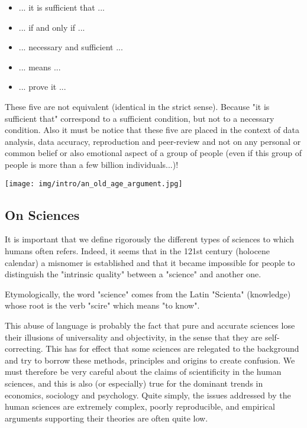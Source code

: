 	\begin{itemize}
	\item ... it is sufficient that ...
	
	\item ... if and only if ...
	
	\item ... necessary and sufficient ...
	
	\item ... means ...
	
	\item ... prove it ...
	\end{itemize}
	These five are not equivalent (identical in the strict sense). Because "it is sufficient that" correspond to a sufficient condition, but not to a necessary condition. Also it must be notice that these five are placed in the context of data analysis, data accuracy, reproduction and peer-review and not on any personal or common belief or also emotional aspect of a group of people (even if this group of people is more than a few billion individuals...)!
	\begin{center}
		\texttt{[image: img/intro/an\_old\_age\_argument.jpg]}
	\end{center}

	\subsection{On Sciences}	
	It is important that we define rigorously the different types of sciences to which humans often refers. Indeed, it seems that in the 121st century (holocene calendar) a misnomer is established and that it became impossible for people to distinguish the "intrinsic quality" between a "science" and another one.

	\begin{tcolorbox}[title=Remark,arc=10pt,breakable,drop lifted shadow,
  skin=enhanced,
  skin first is subskin of={enhancedfirst}{arc=10pt,no shadow},
  skin middle is subskin of={enhancedmiddle}{arc=10pt,no shadow},
  skin last is subskin of={enhancedlast}{drop lifted shadow}]
Etymologically, the word "science" comes from the Latin "Scienta" (knowledge) whose root is the verb "scire" which means "to know".
	\end{tcolorbox}

This abuse of language is probably the fact that pure and accurate sciences lose their illusions of universality and objectivity, in the sense that they are self-correcting. This has for effect that some sciences are relegated to the background and try to borrow these methods, principles and origins to create confusion. We must therefore be very careful about the claims of scientificity in the human sciences, and this is also (or especially) true for the dominant trends in economics, sociology and psychology. Quite simply, the issues addressed by the human sciences are extremely complex, poorly reproducible, and empirical arguments supporting their theories are often quite low.

